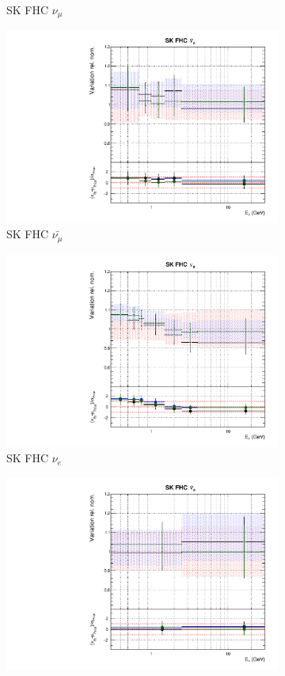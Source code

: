 \begin{figure}
\begin{subfigure}{0.45\textwidth}
  \caption{SK FHC $\nu_{\mu}$}
\end{subfigure}
\begin{subfigure}{0.45\textwidth}
  \centering
  \includegraphics[width=0.75\linewidth]{figs/fgdfitsflux_9}
  \caption{SK FHC $\bar{\nu_{\mu}}$}
\end{subfigure}
\begin{subfigure}{0.45\textwidth}
  \centering
  \includegraphics[width=0.75\linewidth]{figs/fgdfitsflux_10}
  \caption{SK FHC $\nu_e$}
\end{subfigure}
\begin{subfigure}{0.45\textwidth}
  \centering
  \includegraphics[width=0.75\linewidth]{figs/fgdfitsflux_11}

\end{subfigure}
\end{figure}
